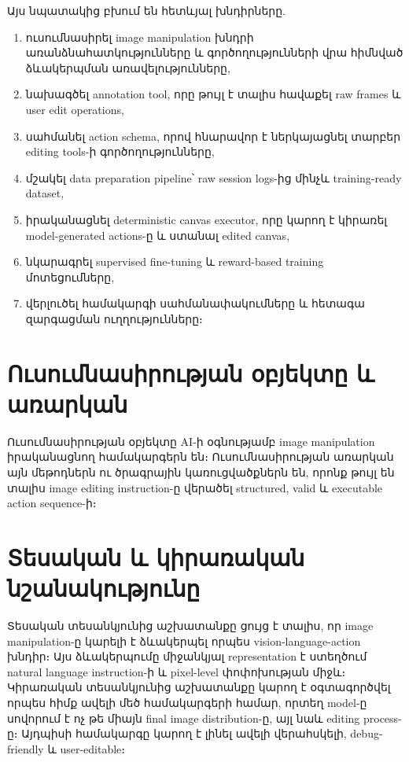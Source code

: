 \documentclass[12pt,a4paper]{report}
\newcommand{\Eng}[1]{\textenglish{#1}}
\begin{document}
Այս նպատակից բխում են հետևյալ խնդիրները.
\begin{enumerate}
    \item ուսումնասիրել image manipulation խնդրի առանձնահատկությունները և գործողությունների վրա հիմնված ձևակերպման առավելությունները,
    \item նախագծել annotation tool, որը թույլ է տալիս հավաքել raw frames և user edit operations,
    \item սահմանել action schema, որով հնարավոր է ներկայացնել տարբեր editing tools-ի գործողությունները,
    \item մշակել data preparation pipeline՝ raw session logs-ից մինչև training-ready dataset,
    \item իրականացնել deterministic canvas executor, որը կարող է կիրառել model-generated actions-ը և ստանալ edited canvas,
    \item նկարագրել supervised fine-tuning և reward-based training մոտեցումները,
    \item վերլուծել համակարգի սահմանափակումները և հետագա զարգացման ուղղությունները։
\end{enumerate}

\section*{Ուսումնասիրության օբյեկտը և առարկան}

Ուսումնասիրության օբյեկտը \Eng{AI}-ի օգնությամբ image manipulation իրականացնող համակարգերն են։ Ուսումնասիրության առարկան այն մեթոդներն ու ծրագրային կառուցվածքներն են, որոնք թույլ են տալիս image editing instruction-ը վերածել structured, valid և executable action sequence-ի։

\section*{Տեսական և կիրառական նշանակությունը}

Տեսական տեսանկյունից աշխատանքը ցույց է տալիս, որ image manipulation-ը կարելի է ձևակերպել որպես \Eng{vision-language-action} խնդիր։ Այս ձևակերպումը միջանկյալ representation է ստեղծում natural language instruction-ի և pixel-level փոփոխության միջև։ Կիրառական տեսանկյունից աշխատանքը կարող է օգտագործվել որպես հիմք ավելի մեծ համակարգերի համար, որտեղ model-ը սովորում է ոչ թե միայն final image distribution-ը, այլ նաև editing process-ը։ Այդպիսի համակարգը կարող է լինել ավելի վերահսկելի, debug-friendly և user-editable։
\end{document}
